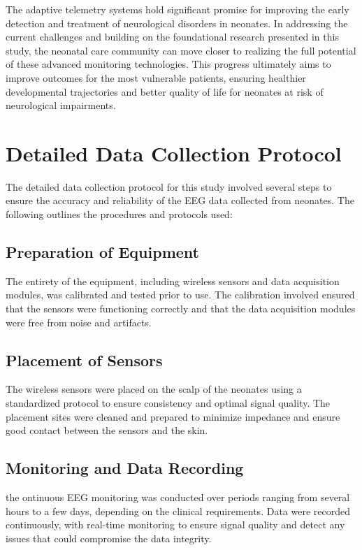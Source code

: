 \documentclass[12pt,journal,compsoc]{IEEEtran}
\begin{document}
The adaptive telemetry systems hold significant promise for improving the early detection and treatment of neurological disorders in neonates. In addressing the current challenges and building on the foundational research presented in this study, the neonatal care community can move closer to realizing the full potential of these advanced monitoring technologies. This progress ultimately aims to improve outcomes for the most vulnerable patients, ensuring healthier developmental trajectories and better quality of life for neonates at risk of neurological impairments.

\appendices
\section{Detailed Data Collection Protocol}
The detailed data collection protocol for this study involved several steps to ensure the accuracy and reliability of the EEG data collected from neonates. The following outlines the procedures and protocols used:

\subsection{Preparation of Equipment}
The entirety of the equipment, including wireless sensors and data acquisition modules, was calibrated and tested prior to use. The calibration involved ensured that the sensors were functioning correctly and that the data acquisition modules were free from noise and artifacts.

\subsection{Placement of Sensors}
The wireless sensors were placed on the scalp of the neonates using a standardized protocol to ensure consistency and optimal signal quality. The placement sites were cleaned and prepared to minimize impedance and ensure good contact between the sensors and the skin.

\subsection{Monitoring and Data Recording}
the ontinuous EEG monitoring was conducted over periods ranging from several hours to a few days, depending on the clinical requirements. Data were recorded continuously, with real-time monitoring to ensure signal quality and detect any issues that could compromise the data integrity.
\end{document}
